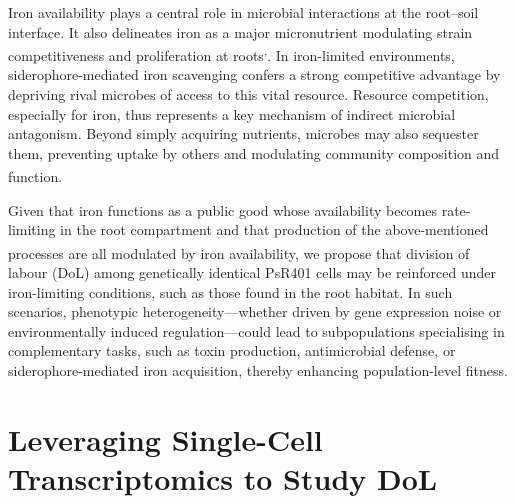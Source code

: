 \documentclass[
  11pt,
  a4paper,
]{report}
\begin{document}
Iron availability plays a central role in microbial interactions at the
root--soil interface. It also delineates iron as a major micronutrient
modulating strain competitiveness and proliferation at
roots\textsuperscript{,}.
In iron-limited environments, siderophore-mediated iron scavenging
confers a strong competitive advantage by depriving rival microbes of
access to this vital resource. Resource competition, especially for
iron, thus represents a key mechanism of indirect microbial antagonism.
Beyond simply acquiring nutrients, microbes may also sequester them,
preventing uptake by others and modulating community composition and
function\textsuperscript{}.

\begin{tcolorbox}[enhanced jigsaw, arc=.35mm, colbacktitle=quarto-callout-tip-color!10!white, rightrule=.15mm, title=\textcolor{quarto-callout-tip-color}{\faLightbulb}\hspace{0.5em}{Biological Hypothesis}, coltitle=black, bottomrule=.15mm, left=2mm, opacityback=0, colback=white, toprule=.15mm, toptitle=1mm, titlerule=0mm, breakable, bottomtitle=1mm, opacitybacktitle=0.6, colframe=quarto-callout-tip-color-frame, leftrule=.75mm]

Given that iron functions as a public good whose availability becomes
rate-limiting in the root compartment and that production of the
above-mentioned processes are all modulated by iron
availability,\textsuperscript{} we propose
that division of labour (DoL) among genetically identical PsR401 cells
may be reinforced under iron-limiting conditions, such as those found in
the root habitat. In such scenarios, phenotypic heterogeneity---whether
driven by gene expression noise or environmentally induced
regulation---could lead to subpopulations specialising in complementary
tasks, such as toxin production, antimicrobial defense, or
siderophore-mediated iron acquisition, thereby enhancing
population-level fitness.

\end{tcolorbox}

\section{Leveraging Single-Cell Transcriptomics to Study
DoL}\label{leveraging-single-cell-transcriptomics-to-study-dol}
\end{document}
